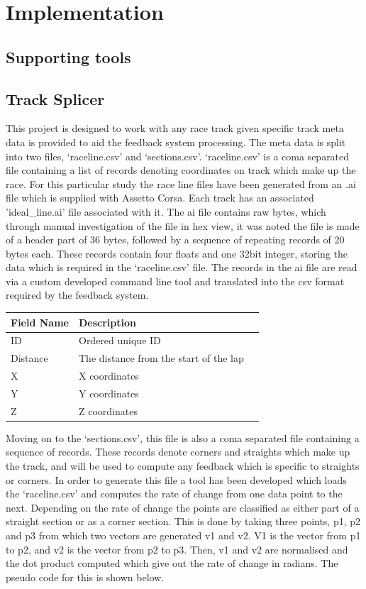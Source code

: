 \section{Implementation}

\subsection{Supporting tools}

\subsection{Track Splicer}
This project is designed to work with any race track given specific track meta data is provided to aid the feedback system processing. The meta data is split into two files, ‘raceline.csv’ and ‘sections.csv’. ‘raceline.csv’ is a coma separated file containing a list of records denoting coordinates on track which make up the race. For this particular study the race line files have been generated from an .ai file which is supplied with Assetto Corsa. Each track has an associated 'ideal\_line.ai' file associated with it. The ai file contains raw bytes, which through manual investigation of the file in hex view, it was noted the file is made of a header part of 36 bytes, followed by a sequence of repeating records of 20 bytes each. These records contain four floats and one 32bit integer, storing the data which is required in the ‘raceline.csv’ file. The records in the ai file are read via a custom developed command line tool and translated into the csv format required by the feedback system. 	

\begin{center}
    \begin{tabular}{ | l | l | p{5cm} |}
    \hline
    Field Name & Description \\ \hline
    ID & Ordered unique ID \\ \hline
    Distance & The distance from the start of the lap \\ \hline
    X & X coordinates \\ \hline
    Y & Y coordinates \\ \hline
    Z & Z coordinates \\ \hline
    \end{tabular}
\end{center}

Moving on to the ‘sections.csv’, this file is also a coma separated file containing a sequence of records. These records denote corners and straights which make up the track, and will be used to compute any feedback which is specific to straights or corners. In order to generate this file a tool has been developed which loads the ‘raceline.csv’ and computes the rate of change from one data point to the next. Depending on the rate of change the points are classified as either part of a straight section or as a corner section. This is done by taking three points, p1, p2 and p3 from which two vectors are generated v1 and v2. V1 is the vector from p1 to p2, and v2 is the vector from p2 to p3. Then, v1 and v2 are normalised and the dot product computed which give out the rate of change in radians. The pseudo code for this is shown below.\\

